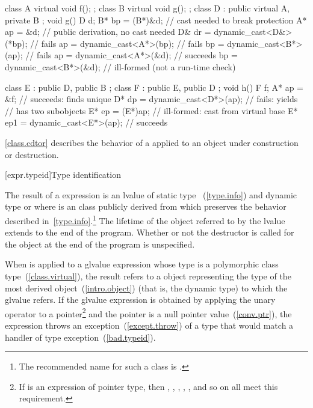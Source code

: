 \begin{codeblock}
class A { virtual void f(); };
class B { virtual void g(); };
class D : public virtual A, private B { };
void g() {
  D   d;
  B*  bp = (B*)&d;                  // cast needed to break protection
  A*  ap = &d;                      // public derivation, no cast needed
  D&  dr = dynamic_cast<D&>(*bp);   // fails
  ap = dynamic_cast<A*>(bp);        // fails
  bp = dynamic_cast<B*>(ap);        // fails
  ap = dynamic_cast<A*>(&d);        // succeeds
  bp = dynamic_cast<B*>(&d);        // ill-formed (not a run-time check)
}

class E : public D, public B { };
class F : public E, public D { };
void h() {
  F   f;
  A*  ap  = &f;                     // succeeds: finds unique 
  D*  dp  = dynamic_cast<D*>(ap);   // fails: yields 
                                    //  has two  subobjects
  E*  ep  = (E*)ap;                 // ill-formed: cast from virtual base
  E*  ep1 = dynamic_cast<E*>(ap);   // succeeds
}
\end{codeblock}
\exitexample 
\enternote
\ref{class.cdtor} describes the behavior of a 
applied to an object under construction or destruction.
\exitnote 

[expr.typeid]{Type identification}

\pnum
{}%
%
The result of a  expression is an lvalue of static type
%
%
 ~(\ref{type.info}) and dynamic type 
 or   where  is an
 class publicly derived from
 which preserves the behavior described
in~\ref{type.info}.\footnote{The recommended name for such a class is
.}
The lifetime of the object referred to by the lvalue extends to the end
of the program. Whether or not the destructor is called for the
 object at the end of the program is unspecified.

\pnum
When  is applied to a glvalue expression whose type is a
polymorphic class type~(\ref{class.virtual}), the result refers to a
 object representing the type of the most derived
object~(\ref{intro.object}) (that is, the dynamic type) to which the
glvalue refers. If the glvalue expression is obtained by applying the
unary \tcode{*} operator to a pointer\footnote{If  is an expression of
pointer type, then ,
, , , , and so on
all meet this requirement.}
and the pointer is a null pointer value~(\ref{conv.ptr}), the
 expression throws an exception~(\ref{except.throw}) of
a type that would match a handler of type
%
%
exception~(\ref{bad.typeid}).

